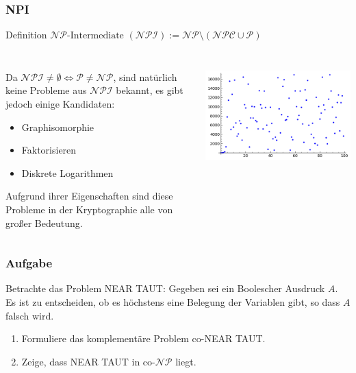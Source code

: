 \begin{frame}
\frametitle{NPI}
\begin{block}{Definition}
$\mathcal{NP}\text{-Intermediate } (\mathcal{NPI}) := \mathcal{NP} \setminus (\mathcal{NPC} \cup \mathcal{P})$
\end{block}
$$ $$ %

\begin{columns}%
		\begin{column}{0.6 \textwidth}%
			Da $\mathcal{NPI} \neq \emptyset \iff \mathcal{P} \neq \mathcal{NP}$, sind natürlich keine Probleme aus $\mathcal{NPI}$ bekannt, es gibt jedoch einige Kandidaten:
\begin{itemize}
	\item Graphisomorphie
	\item Faktorisieren
	\item Diskrete Logarithmen
	
\end{itemize}

Aufgrund ihrer Eigenschaften sind diese Probleme in der Kryptographie alle von großer Bedeutung.

		\end{column}%
		\begin{column}{0.35 \textwidth}%
	\ducttape{1cm} \includegraphics[scale=.3]{images/dlog.png}
		\end{column}%
	\end{columns}%
	\vfill%
\end{frame}


\begin{frame}
\frametitle{Aufgabe}
Betrachte das Problem NEAR TAUT: Gegeben sei ein Boolescher Ausdruck $A$. Es ist zu entscheiden, ob es höchstens eine Belegung der Variablen gibt, so dass $A$ falsch wird.
\begin{enumerate}
 \item Formuliere das komplementäre Problem co-NEAR TAUT.
 \item Zeige, dass NEAR TAUT in co-$\mathcal{NP}$ liegt.
\end{enumerate}
\end{frame}


